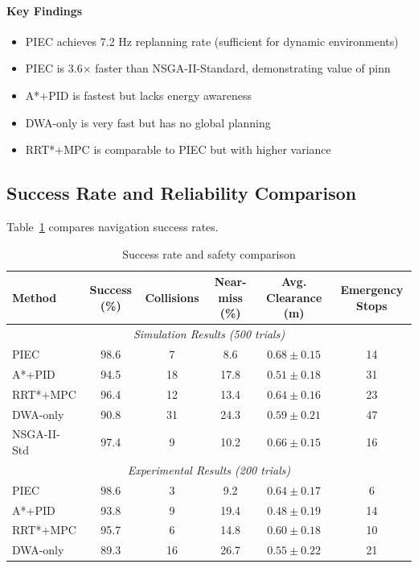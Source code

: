 \paragraph{Key Findings}
\begin{itemize}
    \item PIEC achieves 7.2 Hz replanning rate (sufficient for dynamic environments)
    \item PIEC is 3.6$\times$ faster than NSGA-II-Standard, demonstrating value of \acrshort{pinn}
    \item A*+PID is fastest but lacks energy awareness
    \item DWA-only is very fast but has no global planning
    \item RRT*+MPC is comparable to PIEC but with higher variance
\end{itemize}

\subsection{Success Rate and Reliability Comparison}

Table~\ref{tab:comparison_success} compares navigation success rates.

\begin{table}[htbp]
\centering
\caption{Success rate and safety comparison}
\label{tab:comparison_success}
\begin{tabular}{lccccc}
\toprule
\textbf{Method} & \textbf{Success (\%)} & \textbf{Collisions} & \textbf{Near-miss (\%)} & \textbf{Avg. Clearance (m)} & \textbf{Emergency Stops} \\
\midrule
\multicolumn{6}{c}{\textit{Simulation Results (500 trials)}} \\
\midrule
PIEC & $\mathbf{98.6}$ & 7 & 8.6 & $\mathbf{0.68 \pm 0.15}$ & 14 \\
A*+PID & 94.5 & 18 & 17.8 & $0.51 \pm 0.18$ & 31 \\
RRT*+MPC & 96.4 & 12 & 13.4 & $0.64 \pm 0.16$ & 23 \\
DWA-only & 90.8 & 31 & 24.3 & $0.59 \pm 0.21$ & 47 \\
NSGA-II-Std & 97.4 & 9 & 10.2 & $0.66 \pm 0.15$ & 16 \\
\midrule
\multicolumn{6}{c}{\textit{Experimental Results (200 trials)}} \\
\midrule
PIEC & $\mathbf{98.6}$ & 3 & 9.2 & $\mathbf{0.64 \pm 0.17}$ & 6 \\
A*+PID & 93.8 & 9 & 19.4 & $0.48 \pm 0.19$ & 14 \\
RRT*+MPC & 95.7 & 6 & 14.8 & $0.60 \pm 0.18$ & 10 \\
DWA-only & 89.3 & 16 & 26.7 & $0.55 \pm 0.22$ & 21 \\
\bottomrule
\end{tabular}
\end{table}


